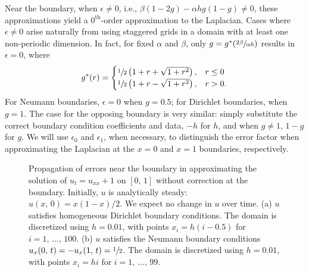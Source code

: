 Near the boundary, when $\epsilon \neq 0$, i.e., $\beta(1-2g)-\alpha hg(1-g)\neq0$,
these approximations yield a $0^\text{th}$-order approximation to the Laplacian. Cases
where $\epsilon \neq 0$ arise naturally from using staggered grids in a domain with at
least one non-periodic dimension. In fact, for fixed $\alpha$ and $\beta$, only
$g=g^\ast(\sfrac{2\beta}{\alpha h})$ results in $\epsilon = 0$, where
\begin{equation*}
    g^\ast(r) = \begin{cases}
        \sfrac12\left(1+r+\sqrt{1+r^2}\right), & r \le 0 \\
        \sfrac12\left(1+r-\sqrt{1+r^2}\right), & r > 0.
    \end{cases}
\end{equation*}
For Neumann boundaries, $\epsilon = 0$ when $g = 0.5$; for Dirichlet boundaries, when
$g = 1$. The case for the opposing boundary is very similar: simply substitute the
correct boundary condition coefficients and data, $-h$ for $h$, and when $g\neq1$, $1-g$
for $g$.  We will use $\epsilon_0$ and $\epsilon_1$, when necessary, to distinguish the
error factor when approximating the Laplacian at the $x=0$ and $x=1$ boundaries,
respectively.

\begin{figure}[t]
\centering
{}
\caption{%
    Propagation of errors near the boundary in approximating the solution of
    $u_t = u_{xx} + 1$ on $[0,\,1]$ without correction at the boundary. Initially, $u$ is
    analytically steady: $u(x,\,0) = x(1-x)/2$. We expect no change in $u$ over time.
    (a) $u$ satisfies homogeneous Dirichlet boundary conditions. The domain is
    discretized using $h=0.01$, with points $x_i=h(i-0.5)$ for $i=1,\,\ldots,\,100$.
    (b) $u$ satisfies the Neumann boundary conditions $u_x(0,\,t)=-u_x(1,\,t)=\sfrac12$.
    The domain is discretized using $h=0.01$, with points $x_i = hi$ for
    $i=1,\,\ldots,\,99$.
}
\label{fig:error}
\end{figure}

